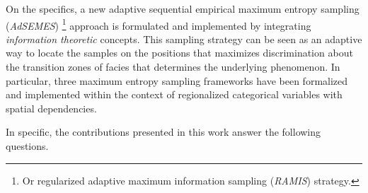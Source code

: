 
On the specifics, a new adaptive sequential empirical maximum entropy sampling (\emph{AdSEMES}) \footnote{Or regularized adaptive maximum information sampling (\emph{RAMIS}) strategy.} approach is formulated and implemented by integrating \emph{information theoretic} concepts. This sampling strategy can be seen as an adaptive way to locate the samples on the positions that maximizes discrimination about the transition zones of facies that determines the underlying phenomenon. In particular, three maximum entropy sampling frameworks have been formalized and implemented within the context of regionalized categorical variables with spatial dependencies.



In specific, the contributions presented in this work answer the following questions.

